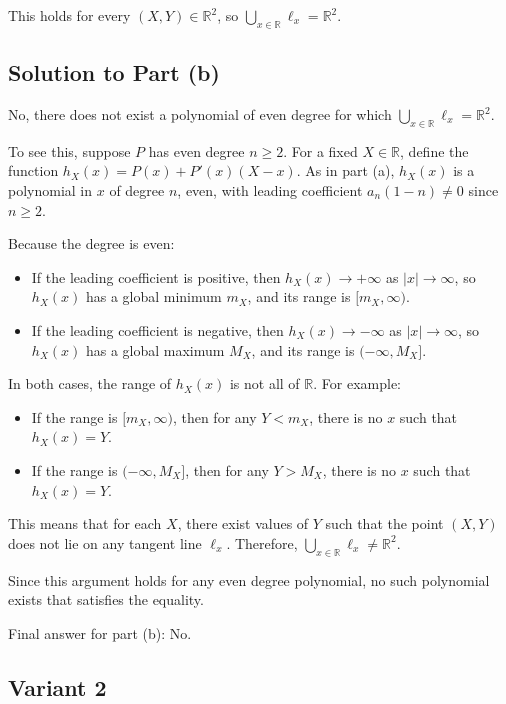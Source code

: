 \documentclass[12pt,a4paper]{article}
\theoremstyle{definition}
\begin{document}
This holds for every $(X, Y) \in \mathbb{R}^2$, so $\bigcup_{x \in \mathbb{R}} \ell_x = \mathbb{R}^2$.

\subsection*{Solution to Part (b)}

No, there does not exist a polynomial of even degree for which $\bigcup_{x \in \mathbb{R}} \ell_x = \mathbb{R}^2$.

To see this, suppose $P$ has even degree $n \geq 2$. For a fixed $X \in \mathbb{R}$, define the function $h_X(x) = P(x) + P'(x)(X - x)$. As in part (a), $h_X(x)$ is a polynomial in $x$ of degree $n$, even, with leading coefficient $a_n (1 - n) \neq 0$ since $n \geq 2$.

Because the degree is even:
\begin{itemize}
\item If the leading coefficient is positive, then $h_X(x) \to +\infty$ as $|x| \to \infty$, so $h_X(x)$ has a global minimum $m_X$, and its range is $[m_X, \infty)$.
\item If the leading coefficient is negative, then $h_X(x) \to -\infty$ as $|x| \to \infty$, so $h_X(x)$ has a global maximum $M_X$, and its range is $(-\infty, M_X]$.
\end{itemize}

In both cases, the range of $h_X(x)$ is not all of $\mathbb{R}$. For example:
\begin{itemize}
\item If the range is $[m_X, \infty)$, then for any $Y < m_X$, there is no $x$ such that $h_X(x) = Y$.
\item If the range is $(-\infty, M_X]$, then for any $Y > M_X$, there is no $x$ such that $h_X(x) = Y$.
\end{itemize}

This means that for each $X$, there exist values of $Y$ such that the point $(X, Y)$ does not lie on any tangent line $\ell_x$. Therefore, $\bigcup_{x \in \mathbb{R}} \ell_x \neq \mathbb{R}^2$.

Since this argument holds for any even degree polynomial, no such polynomial exists that satisfies the equality.

Final answer for part (b): No.

\subsection{Variant 2}
\end{document}
